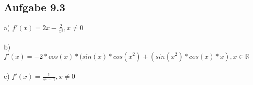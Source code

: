 \documentclass{standalone}
\begin{document}
\subsection{Aufgabe 9.3}

a) $f'(x)=2x-\frac{2}{x^3}, x\neq 0$\\ \\
b) $f'(x)=-2*cos(x)*(sin(x)*cos(x^2)+(sin(x^2)*cos(x)*x), x\in \mathbb{R}$\\ \\
c) $f'(x)=\frac{1}{e^x-1}, x \neq 0$
\end{document}
